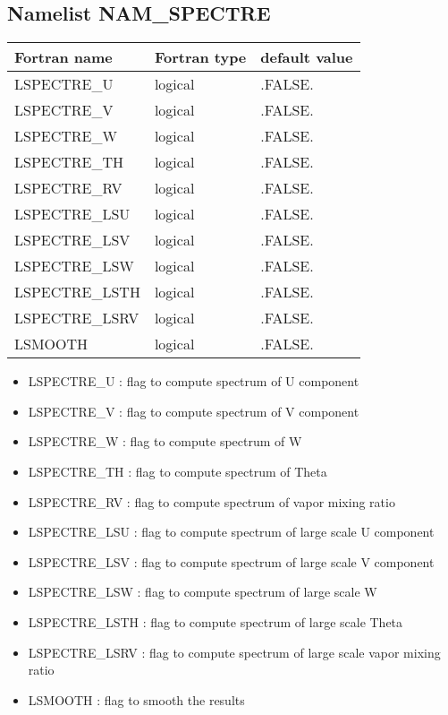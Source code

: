 \subsection{Namelist NAM\_SPECTRE}
\begin{center}
\begin{tabular} {|l|l|l|}
\hline
Fortran name & Fortran type & default value \\
\hline
LSPECTRE\_U &  logical &.FALSE. \\
LSPECTRE\_V &  logical &.FALSE. \\
LSPECTRE\_W &  logical &.FALSE. \\
LSPECTRE\_TH &  logical &.FALSE. \\
LSPECTRE\_RV &  logical &.FALSE. \\
LSPECTRE\_LSU &  logical &.FALSE. \\
LSPECTRE\_LSV &  logical &.FALSE. \\
LSPECTRE\_LSW &  logical &.FALSE. \\
LSPECTRE\_LSTH &  logical &.FALSE. \\
LSPECTRE\_LSRV &  logical &.FALSE. \\
LSMOOTH     &  logical & .FALSE.\\
\hline
\end{tabular}
\end{center}
\begin{itemize}
\item LSPECTRE\_U : flag to compute spectrum of U component
\item LSPECTRE\_V : flag to compute spectrum of V component
\item LSPECTRE\_W : flag to compute spectrum of W
\item LSPECTRE\_TH : flag to compute spectrum of Theta
\item LSPECTRE\_RV : flag to compute spectrum of vapor mixing ratio
\item LSPECTRE\_LSU : flag to compute spectrum of large scale U component
\item LSPECTRE\_LSV : flag to compute spectrum of large scale V component
\item LSPECTRE\_LSW : flag to compute spectrum of large scale W
\item LSPECTRE\_LSTH : flag to compute spectrum of large scale Theta
\item LSPECTRE\_LSRV : flag to compute spectrum of large scale vapor mixing ratio
\item LSMOOTH : flag to smooth the results
\end{itemize}


